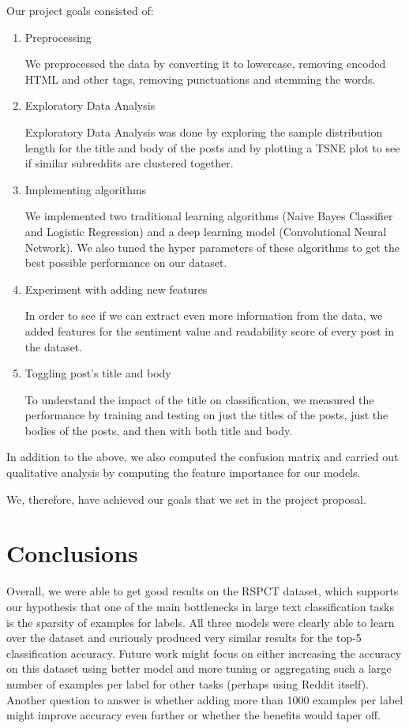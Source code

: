 \documentclass{sig-alternate-05-2015}
\begin{document}
Our project goals consisted of:
\begin{enumerate}
    \item Preprocessing

            We preprocessed the data by converting it to lowercase, removing encoded HTML and other tags, removing punctuations and stemming the words.
    \item Exploratory Data Analysis

            Exploratory Data Analysis was done by exploring the sample distribution length for the title and body of the posts and by plotting a TSNE plot to see if similar subreddits are clustered together.
    \item Implementing algorithms

            We implemented two traditional learning algorithms (Naive Bayes Classifier and Logistic Regression) and a deep learning model (Convolutional Neural Network). We also tuned the hyper parameters of these algorithms to get the best possible performance on our dataset.
    \item Experiment with adding new features

            In order to see if we can extract even more information from the data, we added features for the sentiment value and readability score of every post in the dataset.
    \item Toggling post's title and body

            To understand the impact of the title on classification, we measured the performance by training and testing on just the titles of the posts, just the bodies of the posts, and then with both title and body.

\end{enumerate}

In addition to the above, we also computed the confusion matrix and carried out qualitative analysis by computing the feature importance for our models.

We, therefore, have achieved our goals that we set in the project proposal.

\section{Conclusions}

Overall, we were able to get good results on the RSPCT dataset, which supports our hypothesis that one of the main bottlenecks in large text classification tasks is the sparsity of examples for labels. All three models were clearly able to learn over the dataset and curiously produced very similar results for the top-5 classification accuracy. Future work might focus on either increasing the accuracy on this dataset using better model and more tuning or aggregating such a large number of examples per label for other tasks (perhaps using Reddit itself). Another question to answer is whether adding more than 1000 examples per label might improve accuracy even further or whether the benefits would taper off.
\end{document}
